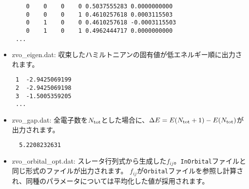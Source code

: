 \begin{itemize}
\begin{minipage}{13cm}
\begin{screen}
\begin{verbatim}
    0    0    0    0 0.5037555283 0.0000000000
    0    0    0    1 0.4610257618 0.0003115503
    0    1    0    0 0.4610257618 -0.0003115503
    0    1    0    1 0.4962444717 0.0000000000
 ...
\end{verbatim}
\end{screen}
\end{minipage}    
    
\item{zvo\_eigen.dat:} 収束したハミルトニアンの固有値が低エネルギー順に出力されます。\\
\begin{minipage}{13cm}
\begin{screen}
\begin{verbatim}
 1  -2.9425069199
 2  -2.9425069198
 3  -1.5005359205 
 ...
\end{verbatim}
\end{screen}
\end{minipage}

\item{zvo\_gap.dat:} 全電子数を$N_{\rm tot}$とした場合に、$\Delta E= E(N_{\rm tot}+1)-E(N_{\rm tot})$が出力されます。

\begin{minipage}{13cm}
\begin{screen}
\begin{verbatim}
  5.2208232631
\end{verbatim}
\end{screen}
\end{minipage}

\item{zvo\_orbital\_opt.dat:} スレータ行列式から生成した$f_{ij}$。\verb|InOrbital|ファイルと同じ形式のファイルが出力されます。
$f_{ij}$が\verb|Orbital|ファイルを参照し計算され、同種のパラメータについては平均化した値が採用されます。

\end{itemize}



